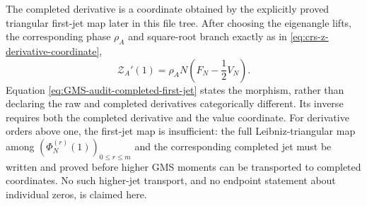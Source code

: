 The completed derivative is a coordinate obtained by the explicitly proved triangular
first-jet map later in this file tree.  After choosing the eigenangle lifts, the corresponding
phase $\rho_A$ and square-root branch exactly as in
\eqref{eq:crs-z-derivative-coordinate},
\begin{equation}
 \mathcal Z_A'(1)=\rho_A N\left(F_N-\frac12V_N\right).
 \label{eq:GMS-audit-completed-first-jet}
\end{equation}
Equation \eqref{eq:GMS-audit-completed-first-jet} states the morphism, rather than declaring
the raw and completed derivatives categorically different.  Its inverse requires both the
completed derivative and the value coordinate.  For derivative orders above one, the first-jet
map is insufficient: the full Leibniz-triangular map among
$(\Phi_N^{(r)}(1))_{0\leq r\leq m}$ and the corresponding completed jet must be written and
proved before higher GMS moments can be transported to completed coordinates.  No such
higher-jet transport, and no endpoint statement about individual zeros, is claimed here.
